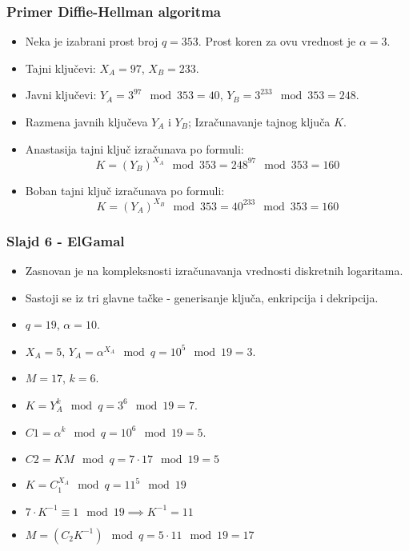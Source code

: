 \documentclass[14pt]{beamer}
\begin{document}
\begin{frame}[fragile]\frametitle{Primer Diffie-Hellman algoritma}
        \small
	\begin{itemize}	
		\item Neka je izabrani prost broj $q=353$. Prost koren za ovu vrednost je $\alpha=3$.
            \item Tajni ključevi: $X_A=97$, $X_B=233$.
            \item Javni ključevi: $Y_A=3^{97}\mod353=40$, \newline $Y_B=3^{233}\mod353=248$.
            \item Razmena javnih ključeva $Y_A$ i $Y_B$; Izračunavanje tajnog ključa $K$.
            \item Anastasija tajni ključ izračunava po formuli: $$K=(Y_B)^{X_A}\mod353=248^{97}\mod353=160$$
            \item Boban tajni ključ izračunava po formuli: $$K=(Y_A)^{X_B}\mod353=40^{233}\mod353=160$$
	\end{itemize}
\end{frame}

\begin{frame}[fragile]\frametitle{Slajd 6 - ElGamal}
        \footnotesize
	\begin{itemize}	
        \itemsep0em
		\item Zasnovan je na kompleksnosti izračunavanja vrednosti diskretnih logaritama.
            \item Sastoji se iz tri glavne tačke - generisanje ključa, enkripcija i dekripcija.
                    \item $q=19$, $\alpha=10$. 
                    \item $X_A=5$, $Y_A=\alpha^{X_A}\mod q=10^5\mod 19=3$.
                    \item $M=17$, $k=6$.
                    \item $K=Y_A^k\mod q=3^6\mod 19=7$.
                    \item $C1=\alpha^k \mod q=10^6\mod 19=5$.
                     \item $C2=KM\mod q=7\cdot17\mod 19=5$
                     \item $K=C_1^{X_A}\mod q=11^5\mod 19$
                    \item $7\cdot K^{-1} \equiv 1 \mod 19 \implies K^{-1}=11$
                    \item $M=(C_2K^{-1})\mod q=5\cdot 11 \mod 19=17$                
	\end{itemize}
\end{frame}
\end{document}
